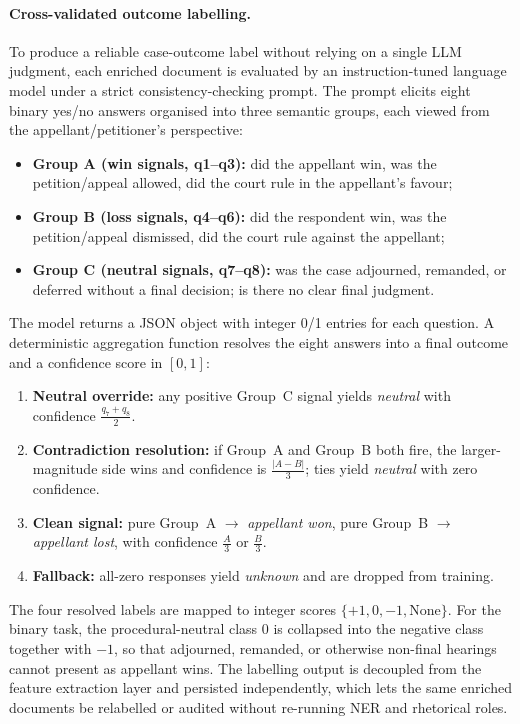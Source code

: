 \documentclass[runningheads]{llncs}
\begin{document}
\paragraph{Cross-validated outcome labelling.}
To produce a reliable case-outcome label without relying on a single LLM judgment, each enriched document is evaluated by an instruction-tuned language model under a strict consistency-checking prompt. The prompt elicits eight binary yes/no answers organised into three semantic groups, each viewed from the appellant/petitioner's perspective:

\begin{itemize}[leftmargin=*]
    \item \textbf{Group A (win signals, q1--q3):} did the appellant win, was the petition/appeal allowed, did the court rule in the appellant's favour;
    \item \textbf{Group B (loss signals, q4--q6):} did the respondent win, was the petition/appeal dismissed, did the court rule against the appellant;
    \item \textbf{Group C (neutral signals, q7--q8):} was the case adjourned, remanded, or deferred without a final decision; is there no clear final judgment.
\end{itemize}

The model returns a JSON object with integer 0/1 entries for each question. A deterministic aggregation function resolves the eight answers into a final outcome and a confidence score in $[0,1]$:

\begin{enumerate}[leftmargin=*]
    \item \textbf{Neutral override:} any positive Group~C signal yields \emph{neutral} with confidence $\frac{q_7+q_8}{2}$.
    \item \textbf{Contradiction resolution:} if Group~A and Group~B both fire, the larger-magnitude side wins and confidence is $\frac{|A-B|}{3}$; ties yield \emph{neutral} with zero confidence.
    \item \textbf{Clean signal:} pure Group~A $\rightarrow$ \emph{appellant won}, pure Group~B $\rightarrow$ \emph{appellant lost}, with confidence $\frac{A}{3}$ or $\frac{B}{3}$.
    \item \textbf{Fallback:} all-zero responses yield \emph{unknown} and are dropped from training.
\end{enumerate}

The four resolved labels are mapped to integer scores $\{+1, 0, -1, \text{None}\}$. For the binary task, the procedural-neutral class $0$ is collapsed into the negative class together with $-1$, so that adjourned, remanded, or otherwise non-final hearings cannot present as appellant wins. The labelling output is decoupled from the feature extraction layer and persisted independently, which lets the same enriched documents be relabelled or audited without re-running NER and rhetorical roles.
\end{document}
